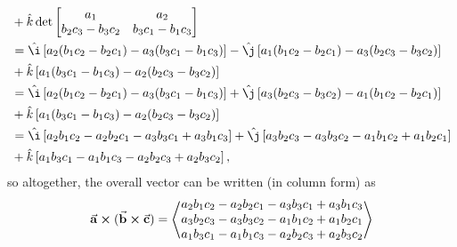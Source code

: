 \documentclass{report}
\newenvironment{answer}
{\begin{minipage}{\linewidth}}
{\end{minipage}}
\begin{document}
\begin{answer}
\begin{align*}
&+ \hat{ k} \det \begin{bmatrix} a_1 & a_2 \\ b_2 c_3 - b_3 c_2 & b_3 c_1 - b_1 c_3 \end{bmatrix} \\
%
&= \hat{\i} \left[ a_2 (b_1 c_2 - b_2 c_1) - a_3 (b_3 c_1 - b_1 c_3) \right]
 - \hat{\j} \left[ a_1 (b_1 c_2 - b_2 c_1) - a_3 (b_2 c_3 - b_3 c_2) \right] \\ 
&+ \hat{ k} \left[ a_1 (b_3 c_1 - b_1 c_3) - a_2 (b_2 c_3 - b_3 c_2) \right] \\
%
&= \hat{\i} \left[ a_2 (b_1 c_2 - b_2 c_1) - a_3 (b_3 c_1 - b_1 c_3) \right]
 + \hat{\j} \left[ a_3 (b_2 c_3 - b_3 c_2) - a_1 (b_1 c_2 - b_2 c_1) \right] \\ 
&+ \hat{ k} \left[ a_1 (b_3 c_1 - b_1 c_3) - a_2 (b_2 c_3 - b_3 c_2) \right] \\
%
&= \hat{\i} \left[ a_2 b_1 c_2 - a_2 b_2 c_1 - a_3 b_3 c_1 + a_3 b_1 c_3 \right]
 + \hat{\j} \left[ a_3 b_2 c_3 - a_3 b_3 c_2 - a_1 b_1 c_2 + a_1 b_2 c_1 \right] \\ 
&+ \hat{ k} \left[ a_1 b_3 c_1 - a_1 b_1 c_3 - a_2 b_2 c_3 + a_2 b_3 c_2 \right],
\end{align*}
so altogether, the overall vector can be written (in column form) as
\begin{equation*}
\va{a} \cross (\va{b} \cross \va{c}) =
\left\langle
\begin{matrix}
a_2 b_1 c_2 - a_2 b_2 c_1 - a_3 b_3 c_1 + a_3 b_1 c_3 \\
a_3 b_2 c_3 - a_3 b_3 c_2 - a_1 b_1 c_2 + a_1 b_2 c_1 \\
a_1 b_3 c_1 - a_1 b_1 c_3 - a_2 b_2 c_3 + a_2 b_3 c_2
\end{matrix}
\right\rangle
\end{equation*}
\end{answer}
\end{document}
